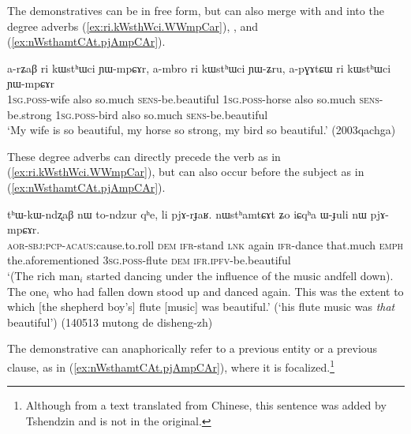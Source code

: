 The demonstratives can be in free form, but can also merge with  and  into the degree adverbs  (\ref{ex:ri.kWsthWci.WWmpCar}), ,  and  (\ref{ex:nWsthamtCAt.pjAmpCAr}).


 \begin{exe}
\ex \label{ex:ri.kWsthWci.WWmpCar}
 \gll  a-rʑaβ ri kɯstʰɯci ɲɯ-mpɕɤr, a-mbro ri kɯstʰɯci ɲɯ-ʑru, a-pɣɤtɕɯ ri kɯstʰɯci ɲɯ-mpɕɤr  \\
 \textsc{1sg}.\textsc{poss}-wife also so.much \textsc{sens}-be.beautiful  \textsc{1sg}.\textsc{poss}-horse also so.much \textsc{sens}-be.strong  \textsc{1sg}.\textsc{poss}-bird also so.much \textsc{sens}-be.beautiful  \\
 \glt `My wife is so beautiful, my horse so strong, my bird so beautiful.' (2003qachga)
 \end{exe}

These degree adverbs can directly precede the verb as in (\ref{ex:ri.kWsthWci.WWmpCar}), but can also occur before the subject as in (\ref{ex:nWsthamtCAt.pjAmpCAr}). 

 \begin{exe}
\ex \label{ex:nWsthamtCAt.pjAmpCAr}
 \gll tʰɯ-kɯ-ndʐaβ nɯ to-ndzur qʰe, li pjɤ-rɟaʁ. nɯstʰamtɕɤt ʑo iɕqʰa ɯ-ɟuli nɯ pjɤ-mpɕɤr. \\
 \textsc{aor}-\textsc{sbj}:\textsc{pcp}-\textsc{acaus}:cause.to.roll \textsc{dem} \textsc{ifr}-stand \textsc{lnk} again \textsc{ifr}-dance that.much \textsc{emph} the.aforementioned \textsc{3sg}.\textsc{poss}-flute \textsc{dem} \textsc{ifr}.\textsc{ipfv}-be.beautiful \\
 \glt `(The rich man$_i$ started dancing under the influence of the music andfell down). The one$_i$ who had fallen down stood up and danced again. This was the extent to which [the shepherd boy's] flute [music] was beautiful.'  (`his flute music was \textit{that} beautiful') (140513 mutong de disheng-zh)
 \end{exe}
 
 The demonstrative can anaphorically refer to a previous entity or a previous clause, as in (\ref{ex:nWsthamtCAt.pjAmpCAr}), where it is focalized.\footnote{Although from a text translated from Chinese, this sentence was added by Tshendzin and is not in the original.  }




